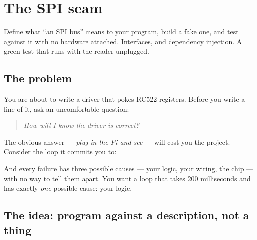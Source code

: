 \chapter{The SPI seam}
\label{ch:spi}

\chapterbrief
  {Define what ``an SPI bus'' means to your program, build a fake one, and test against it with no hardware attached.}
  {Interfaces, and dependency injection.}
  {A green test that runs with the reader unplugged.}

\section{The problem}

You are about to write a driver that pokes RC522 registers. Before you write a
line of it, ask an uncomfortable question:

\begin{quote}\itshape How will I know the driver is correct?\end{quote}

The obvious answer --- \emph{plug in the Pi and see} --- will cost you the
project. Consider the loop it commits you to:

\begin{center}
\end{center}

And every failure has three possible causes --- your logic, your wiring, the
chip --- with no way to tell them apart. You want a loop that takes 200
milliseconds and has exactly \emph{one} possible cause: your logic.

\section{The idea: program against a description, not a thing}

